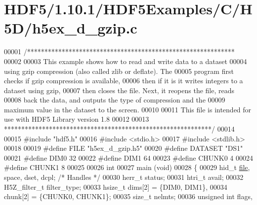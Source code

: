 \hypertarget{_h_d_f5_21_810_81_2_h_d_f5_examples_2_c_2_h5_d_2h5ex__d__gzip_8c_source}{}\section{H\+D\+F5/1.10.1/\+H\+D\+F5\+Examples/\+C/\+H5\+D/h5ex\+\_\+d\+\_\+gzip.c}
\label{_h_d_f5_21_810_81_2_h_d_f5_examples_2_c_2_h5_d_2h5ex__d__gzip_8c_source}

\begin{DoxyCode}
00001 \textcolor{comment}{/************************************************************}
00002 \textcolor{comment}{}
00003 \textcolor{comment}{  This example shows how to read and write data to a dataset}
00004 \textcolor{comment}{  using gzip compression (also called zlib or deflate).  The}
00005 \textcolor{comment}{  program first checks if gzip compression is available,}
00006 \textcolor{comment}{  then if it is it writes integers to a dataset using gzip,}
00007 \textcolor{comment}{  then closes the file.  Next, it reopens the file, reads}
00008 \textcolor{comment}{  back the data, and outputs the type of compression and the}
00009 \textcolor{comment}{  maximum value in the dataset to the screen.}
00010 \textcolor{comment}{}
00011 \textcolor{comment}{  This file is intended for use with HDF5 Library version 1.8}
00012 \textcolor{comment}{}
00013 \textcolor{comment}{ ************************************************************/}
00014 
00015 \textcolor{preprocessor}{#include "hdf5.h"}
00016 \textcolor{preprocessor}{#include <stdio.h>}
00017 \textcolor{preprocessor}{#include <stdlib.h>}
00018 
00019 \textcolor{preprocessor}{#define FILE            "h5ex\_d\_gzip.h5"}
00020 \textcolor{preprocessor}{#define DATASET         "DS1"}
00021 \textcolor{preprocessor}{#define DIM0            32}
00022 \textcolor{preprocessor}{#define DIM1            64}
00023 \textcolor{preprocessor}{#define CHUNK0          4}
00024 \textcolor{preprocessor}{#define CHUNK1          8}
00025 
00026 \textcolor{keywordtype}{int}
00027 main (\textcolor{keywordtype}{void})
00028 \{
00029     hid\_t           \hyperlink{structfile}{file}, space, dset, dcpl;    \textcolor{comment}{/* Handles */}
00030     herr\_t          status;
00031     htri\_t          avail;
00032     H5Z\_filter\_t    filter\_type;
00033     hsize\_t         dims[2] = \{DIM0, DIM1\},
00034                     chunk[2] = \{CHUNK0, CHUNK1\};
00035     \textcolor{keywordtype}{size\_t}          nelmts;
00036     \textcolor{keywordtype}{unsigned} \textcolor{keywordtype}{int}    flags,

\end{DoxyCode}
